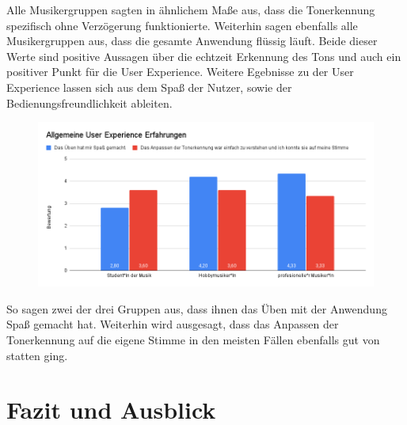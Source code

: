 Alle Musikergruppen sagten in ähnlichem Maße aus, dass die Tonerkennung spezifisch ohne Verzögerung funktionierte. Weiterhin sagen ebenfalls alle Musikergruppen aus, dass die gesamte Anwendung flüssig läuft. Beide dieser Werte sind positive Aussagen über die echtzeit Erkennung des Tons und auch ein positiver Punkt für die User Experience. Weitere Egebnisse zu der User Experience lassen sich aus dem Spaß der Nutzer, sowie der Bedienungsfreundlichkeit ableiten. 
\begin{figure}[H]
    \centering
    \includegraphics[width=1\textwidth]{Bilder/eval-zufriedenheitUX-vergleich.png}
\end{figure} 
So sagen zwei der drei Gruppen aus, dass ihnen das Üben mit der Anwendung Spaß gemacht hat. Weiterhin wird ausgesagt, dass das Anpassen der Tonerkennung auf die eigene Stimme in den meisten Fällen ebenfalls gut von statten ging. 

\chapter{Fazit und Ausblick}

